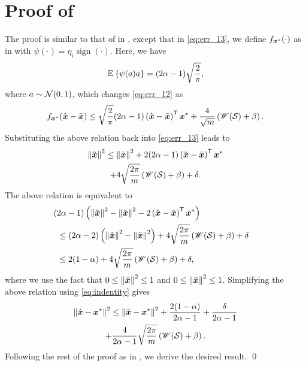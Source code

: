 \documentclass[journal]{IEEEtran}
\newcommand{\wid}{\mathscr{W}}
\DeclareMathOperator{\sign}{sign}
\begin{document}
\section{Proof of }\label{app:noisy}
The proof is similar to that of  in , except that in \eqref{eq:err_13}, we define $f_{\boldsymbol{x}^*}(\cdot)$ as in  with   $\psi(\cdot)=\eta_i\sign(\cdot)$. Here, we have
\begin{equation}
    \mathbb{E}_{}\left\{\psi(a)a\right\} = 
        (2\alpha-1)\sqrt{\frac{2}{\pi}},
\end{equation}
where $a\sim\mathcal{N}(0,1)$, which changes \eqref{eq:err_12} as 
\begin{equation}\label{eq:f_bound}
f_{\vecx^*}(\hat{\vecx}-\bar{\vecx})
\leq \sqrt{\frac{2}{\pi}}(2\alpha-1)\lb\hat{\vecx}-\bar{\vecx}\rb\tran\vecx^*+\frac{4}{\sqrt{m}}\lb\wid(\calS)+\beta\rb.
\end{equation}
Substituting the above relation back into \eqref{eq:err_13} leads to
\begin{multline}
\lV\hat{\vecx}\rV^2\leq \lV\bar{\vecx}\rV^2+2(2\alpha-1)\lb\hat{\vecx}-\bar{\vecx}\rb\tran\vecx^*\\+4\sqrt{\frac{2\pi}{m}}\lb\wid(\calS)+\beta\rb+\delta.
\end{multline}
The above relation is equivalent to 
\begin{align}
    (2\alpha-1)\lb\lV\hat{\vecx}\rV^2- \lV\bar{\vecx}\rV^2-2\lb\hat{\vecx}-\bar{\vecx}\rb\tran\vecx^*\rb\notag\\
    &\hspace{-6cm}\leq (2\alpha-2)\lb\lV\hat{\vecx}\rV^2-\lV\bar{\vecx}\rV^2\rb+4\sqrt{\frac{2\pi}{m}}\lb\wid(\calS)+\beta\rb+\delta\\
    &\hspace{-6cm} \leq 2(1-\alpha)+4\sqrt{\frac{2\pi}{m}}\lb\wid(\calS)+\beta\rb+\delta,
\end{align}
where we use the fact that $0\leq \left\Vert\hat{\boldsymbol{x}}\right\Vert^2\leq 1$ and $0\leq \left\Vert\bar{\boldsymbol{x}}\right\Vert^2\leq 1$.
Simplifying the above relation using \eqref{eq:indentity} gives
\begin{multline}\label{eq:concentration_1}
\lV\hat{\vecx}-\vecx^*\rV^2\leq \lV\bar{\vecx}-\vecx^*\rV^2+\frac{2(1-\alpha)}{2\alpha-1}+\frac{\delta}{2\alpha-1}\\+\frac{4}{2\alpha-1}\sqrt{\frac{2\pi}{m}}\lb\wid(\calS)+\beta\rb.
\end{multline}
Following the rest of the proof as in , we derive the desired result. \hfill\qed
\end{document}
